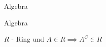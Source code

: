 \documentclass[class=article, crop=false]{standalone}
\begin{document}
\begin{zettel}{Algebra}

\begin{flashcard}[c0fodl7n]{Algebra}
	\begin{definition}[Algebra]
		$R$ - Ring und $A \in  R \implies A^C \in R$
	\end{definition}
\end{flashcard}

\end{zettel}
\end{document}
